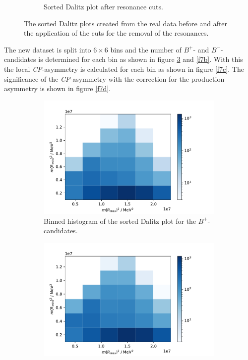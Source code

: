 \begin{figure}[H]
\begin{subfigure}{0.49\textwidth}
    \caption{Sorted Dalitz plot after resonance cuts.}
    \label{f6c}
  \end{subfigure}
  \caption{The sorted Dalitz plots created from the real data before and after the application of the cuts for the removal of the resonances.}
  \label{f6}
\end{figure}

The new dataset is split into $6 \times 6$ bins and the number of $B^+$- and $B^-$-candidates is determined for each bin as shown in figure 
\ref{f7a} and \ref{f7b}. With this the local \textit{CP}-asymmetry is calculated for each bin as shown in figure \ref{f7c}. 
The significance of the \textit{CP}-asymmetry with the correction for the production asymmetry is shown in figure \ref{f7d}. 

\begin{figure}[H]
  \centering
  \begin{subfigure}{0.49\textwidth}
    \includegraphics[width=\textwidth]{plots/Dalitz_sorted_bin_cut_bp.pdf}
    \caption{Binned histogram of the sorted Dalitz plot for the $B^+$-candidates.}
    \label{f7a}
  \end{subfigure}
  \begin{subfigure}{0.49\textwidth}
    \includegraphics[width=\textwidth]{plots/Dalitz_sorted_bin_cut_bm.pdf}

\end{subfigure}
\end{figure}
